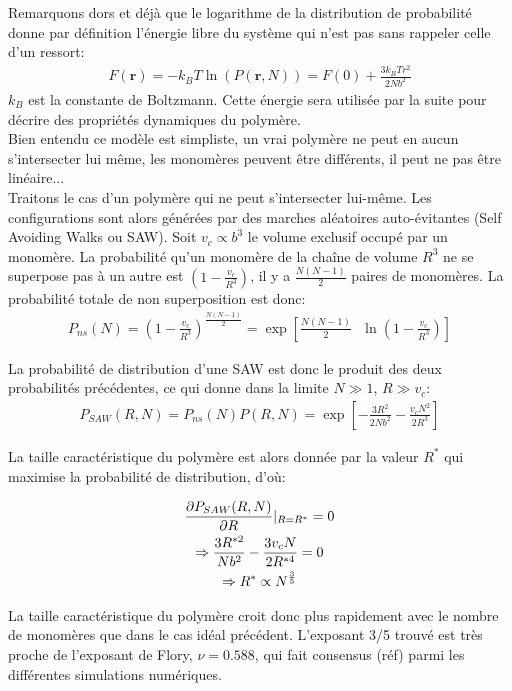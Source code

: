 \documentclass[a4paper,11pt]{article}
\begin{document}
Remarquons dors et déjà que le logarithme de la distribution de probabilité donne par définition l'énergie libre du système qui n'est pas sans rappeler celle d'un ressort:
\begin{eqnarray}
F(\textbf{r})= - k_B T \ln(P(\textbf{r},N))= F(0)+\frac{3k_BTr^2}{2Nb^2}
\label{elibre}
\end{eqnarray}
$k_B$ est la constante de Boltzmann. Cette énergie sera utilisée par la suite pour décrire des propriétés dynamiques du polymère.\\



Bien entendu ce modèle est simpliste, un vrai polymère ne peut en aucun s'intersecter lui même, les monomères peuvent être différents, il peut ne pas être linéaire...\\

 Traitons le cas d'un polymère qui ne peut s'intersecter lui-même. Les configurations sont alors générées par des marches aléatoires auto-évitantes (Self Avoiding Walks ou SAW). Soit $v_c \propto b^3$ le volume exclusif occupé par un monomère. La probabilité qu'un monomère de la chaîne de volume $R^3$ ne se superpose pas à un autre est $(1-\frac{v_c}{R^3})$, il y a $\frac{N(N-1)}{2}$ paires de monomères. La probabilité totale de non superposition est donc:
 \begin{eqnarray}
P_{ns}(N)= \left(1-\frac{v_c}{R^3}\right)^{\frac{N(N-1)}{2}} = \exp\left[\frac{N(N-1)}{2}\text{ }\ln\left(1-\frac{v_c}{R^3}\right)\right]
\end{eqnarray}

La probabilité de distribution d'une SAW est donc le produit des deux probabilités précédentes, ce qui donne dans la limite $N \gg 1$, $R \gg v_c$:
\begin{eqnarray}
P_{SAW}(R,N)=P_{ns}(N) P(R,N)=\exp\left[-\frac{3R^2}{2 N b^2}-\frac{v_cN^2}{2R^3}\right]
\end{eqnarray}

La taille caractéristique du polymère est alors donnée par la valeur $R^*$ qui maximise la probabilité de distribution, d'où:

\begin{gather}
\frac{\partial P_{SAW}(R,N)}{\partial R} \Huge{|} _{R=R^*}=0 \nonumber\\
\Rightarrow \frac{3R^{*2}}{Nb^2}-\frac{3v_cN}{2R^{*4}} =0 \\
\Rightarrow R^* \propto N^\frac{3}{5}\nonumber
\end{gather}


La taille caractéristique du polymère croit donc plus rapidement avec le nombre de monomères que dans le cas idéal précédent. L'exposant 3/5 trouvé est très proche de l'exposant de Flory, $\nu=0.588$, qui fait consensus (réf) parmi les différentes simulations numériques. \\
\end{document}
